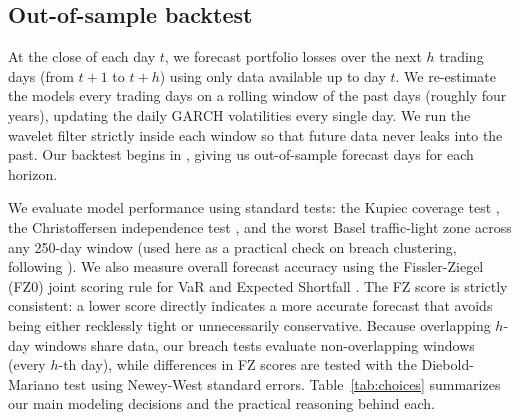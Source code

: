 \documentclass[11pt,a4paper]{article}
\begin{document}
\subsection{Out-of-sample backtest}

At the close of each day $t$, we forecast portfolio losses over the next $h$ trading days (from $t+1$ to $t+h$) using only data available up to day $t$. We re-estimate the models every \RefitEvery{} trading days on a rolling window of the past \RollingWindow{} days (roughly four years), updating the daily GARCH volatilities every single day. We run the wavelet filter strictly inside each window so that future data never leaks into the past. Our backtest begins in \ForecastStart{}, giving us \ForecastDays{} out-of-sample forecast days for each horizon.

We evaluate model performance using standard tests: the Kupiec coverage test \cite{kupiec1995}, the Christoffersen independence test \cite{christoffersen1998}, and the worst Basel traffic-light zone across any 250-day window (used here as a practical check on breach clustering, following \cite{basel1996}). We also measure overall forecast accuracy using the Fissler-Ziegel (FZ0) joint scoring rule for VaR and Expected Shortfall \cite{fissler2016, patton2019}. The FZ score is strictly consistent: a lower score directly indicates a more accurate forecast that avoids being either recklessly tight or unnecessarily conservative. Because overlapping $h$-day windows share data, our breach tests evaluate non-overlapping windows (every $h$-th day), while differences in FZ scores are tested with the Diebold-Mariano test using Newey-West standard errors. Table~\ref{tab:choices} summarizes our main modeling decisions and the practical reasoning behind each.
\end{document}
